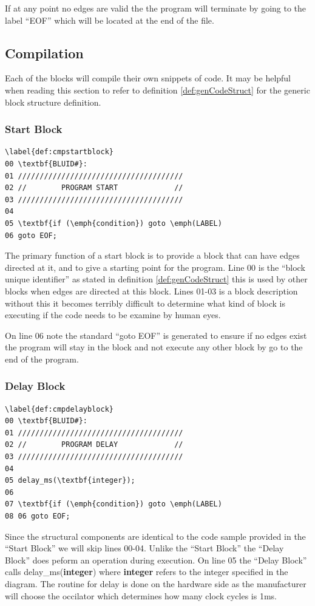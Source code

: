 If at any point no edges are valid the the program will terminate by going to the label ``EOF'' which will be located at the end of the file.


\subsection{Compilation}
Each of the blocks will compile their own snippets of code. It may be helpful when reading this section to refer to definition \ref{def:genCodeStruct} for the generic block structure definition.

\subsubsection{Start Block}
\begin{lstlisting}
\label{def:cmpstartblock}
00 \textbf{BLUID#}:
01 //////////////////////////////////////
02 //        PROGRAM START             //
03 //////////////////////////////////////
04 
05 \textbf{if (\emph{condition}) goto \emph(LABEL)
06 goto EOF;
\end{lstlisting}

The primary function of a start block is to provide a block that can have edges directed at it, and to give a starting point for the program. Line 00 is the ``block unique identifier'' as stated in definition \ref{def:genCodeStruct} this is used by other blocks when edges are directed at this block. Lines 01-03 is a block description without this it becomes terribly difficult to determine what kind of block is executing if the code needs to be examine by human eyes. 

On line 06 note the standard ``goto EOF'' is generated to ensure if no edges exist the program will stay in the block and not execute any other block by go to the end of the program.

\subsubsection{Delay Block}
\begin{lstlisting}
\label{def:cmpdelayblock}
00 \textbf{BLUID#}:
01 //////////////////////////////////////
02 //        PROGRAM DELAY             //
03 //////////////////////////////////////
04
05 delay_ms(\textbf{integer});
06 
07 \textbf{if (\emph{condition}) goto \emph(LABEL)
08 06 goto EOF;
\end{lstlisting}

Since the structural components are identical to the code sample provided in the ``Start Block'' we will skip lines 00-04. Unlike the ``Start Block'' the ``Delay Block'' does peform an operation during execution. On line 05 the ``Delay Block'' calls delay_ms(\textbf{integer}) where \textbf{integer} refers to the integer specified in the diagram. The routine for delay is done on the hardware side as the manufacturer will choose the occilator which determines how many clock cycles is 1ms.

